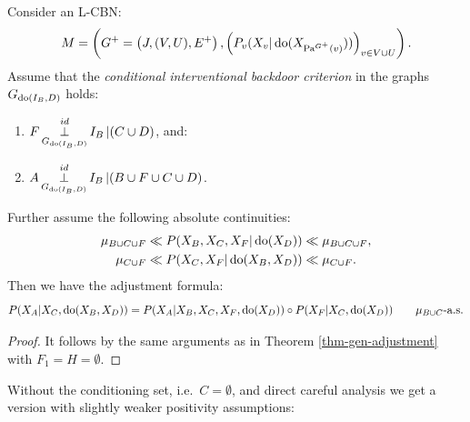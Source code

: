\begin{Cor}
    \label{cor:backdoor-cond-int}
    Consider an L-CBN:
        \[M= \left ( G^+=\left ( J,(V,U),E^+ \right ), \left ( P_v ( X_v|\operatorname{do}( X_{\mathrm{Pa}^{G^+}(v)})) \right )_{v \in V \cup U} \right ).\]
  Assume that the \emph{conditional interventional backdoor criterion} in the graphs $G_{\operatorname{do}(I_B,D)}$ holds:
\begin{enumerate}
    \item $\displaystyle F \operatorname*{\perp}^{id}_{G_{\operatorname{do}(I_B,D)}} I_B  \operatorname*{|} (C \cup D)$, and:
    \item $\displaystyle A \operatorname*{\perp}^{id}_{G_{\operatorname{do}(I_B,D)}} I_B  \operatorname*{|} (B \cup F \cup C \cup D)$.
\end{enumerate}
    Further assume the following absolute continuities:
  \begin{align*}
      \mu_{B \cup C \cup F} &\ll  P(X_B,X_C,X_F|\operatorname{do}(X_D)) \ll \mu_{B \cup C \cup F},\\
      \mu_{C \cup F} &\ll  P(X_C,X_F|\operatorname{do}(X_B,X_D)) \ll \mu_{C \cup F}.
  \end{align*}
Then we have the adjustment formula: 
\[ P(X_A|X_C,\operatorname{do}(X_B,X_D)) = P(X_A|X_B,X_C,X_F,\operatorname{do}(X_D)) \circ P(X_F|X_C,\operatorname{do}(X_D)) \qquad \mu_{B \cup C}\text{-a.s.} \]
\begin{proof}
    It follows by the same arguments as in Theorem \ref{thm-gen-adjustment} with $F_1=H=\emptyset$.
\end{proof}
\end{Cor}

Without the conditioning set, i.e.\ $C=\emptyset$, and direct careful analysis we get a version with slightly weaker positivity assumptions:

